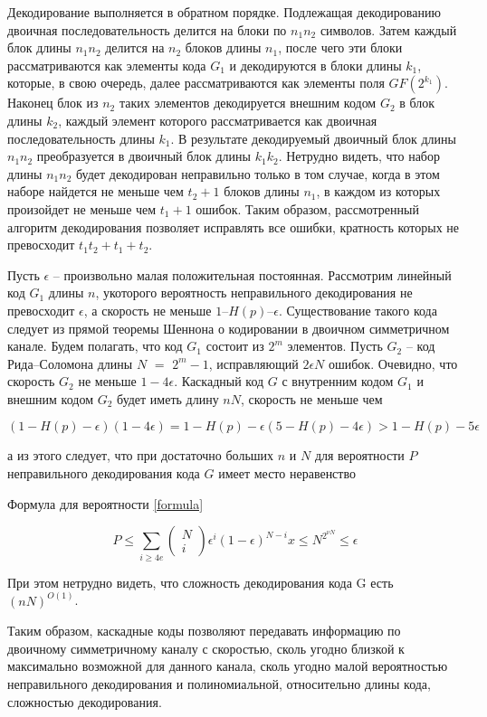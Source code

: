 \documentclass[12pt]{article}
\numberwithin{equation}{section}
\begin{document}
	Декодирование выполняется в обратном порядке. Подлежащая декодированию двоичная последовательность делится на блоки по $n_1n_2$ символов.
	Затем каждый блок длины $n_1n_2$ делится на $n_2$ блоков длины $n_1$, после чего эти блоки рассматриваются как элементы кода $G_1$ и декодируются в блоки
	длины $k_1$, которые, в свою очередь, далее рассматриваются как элементы
	поля $GF(2^{{k}_{1}})$. Наконец блок из
	$n_2$ таких элементов декодируется внешним
	кодом
	$G_2$ в блок длины $k_2$, каждый элемент которого рассматривается как
	двоичная последовательность длины $k_1$. В результате декодируемый двоичный блок длины
	$n_1n_2$ преобразуется в двоичный блок длины $k_1k_2$. Нетрудно
	видеть, что набор длины
	$n_1n_2$ будет декодирован неправильно только в том
	случае, когда в этом наборе найдется не меньше чем $t_2+1$ блоков длины
	$n_1$,
	в каждом из которых произойдет не меньше чем $t_1+1$ ошибок. Таким образом, рассмотренный алгоритм декодирования позволяет исправлять все
	ошибки, кратность которых не превосходит $t_1t_2 + t_1 + t_2$.
	
	Пусть $\epsilon$ -- произвольно малая положительная постоянная. Рассмотрим
	линейный код
	$G_1$ длины $n$, укоторого вероятность неправильного декодирования не превосходит $\epsilon$, а скорость не меньше 
	$1$--$H(p)$--$\epsilon$. Существование
	такого кода следует из прямой теоремы Шеннона о кодировании в двоичном
	симметричном канале. Будем полагать, что код $G_1$ состоит из $2^m$ элементов. Пусть
	$G_2$ -- код Рида–Соломона длины
	$N$ $=$ $2^{m}-1$, исправляющий 
	$2\epsilon N$
	ошибок. Очевидно, что скорость
	$G_2$ не меньше $1-4\epsilon $. Каскадный код
	$G$ с внутренним кодом
	$G_1$ и внешним кодом
	$G_2$ будет иметь длину $nN$, скорость
	не меньше чем
	
	$$\left(1-H\left(p\right)-\epsilon \right)\left(1-4\epsilon \right)
	=
	1-H\left(p\right)-\epsilon\left(5-H\left(p\right)-4\epsilon\right)
	>1-H(p)-5\epsilon$$
	
	а из этого следует, что при достаточно больших $n$ и $N$ для вероятности $P$ неправильного декодирования кода $G$ имеет место неравенство 
	
	Формула для вероятности \ref{formula}
	
	\begin{equation}\label{formula}
	P\le \sum _{i\ge 4e}\left(\begin{array}{c}N\\ i\end{array}\right){\epsilon }^{i}{\left(1-\epsilon \right)}^{N-i}x\le {N}^{{2}^{\nu N}}\le \epsilon 
	\end{equation}
	
	При этом нетрудно видеть, что сложность декодирования кода
	G есть $(nN)^{{O}{(1)}}$.
	
	Таким образом, каскадные коды позволяют передавать информацию по
	двоичному симметричному каналу с скоростью, сколь угодно близкой к
	максимально возможной для данного канала, сколь угодно малой вероятностью неправильного декодирования и полиномиальной, относительно
	длины кода, сложностью декодирования.
\end{document}
